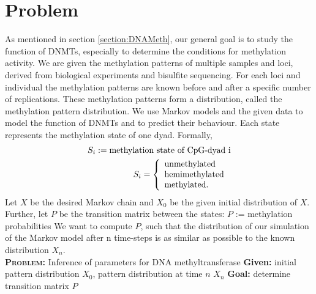 \section{Problem} 
\label{section:Problem}
As mentioned in section \ref{section:DNAMeth}, our general goal is to study the function of \acp{DNMT}, especially to determine the conditions for methylation activity. We are given the methylation patterns of multiple samples and loci, derived from biological experiments and bisulfite sequencing. For each loci and individual the methylation patterns are known before and after a specific number of replications. These methylation patterns form a distribution, called the methylation pattern distribution. We use Markov models and the given data to model the function of \acp{DNMT} and to predict their behaviour. Each state represents the methylation state of one dyad. Formally,
\begin{align}
S_i := \text{methylation state of CpG-dyad i}\\
S_i = \left\{
\begin{array}{l}
\text{unmethylated} \\
\text{hemimethylated} \\
\text{methylated.}
\end{array}
\right.\newline
\end{align}
Let $X$ be the desired Markov chain and $X_0$ be the given initial distribution of $X$. Further, let $P$ be the transition matrix between the states:\newline
$P$ := methylation probabilities\newline
We want to compute $P$, such that the distribution of our simulation of the Markov model after n time-steps is as similar as possible to the known distribution $X_n$.\\

\textbf{\textsc{Problem:}} Inference of parameters for DNA methyltransferase\newline
\textbf{Given:} initial pattern distribution $X_0$, pattern distribution at time $n$ $X_n$\newline
\textbf{Goal:} determine transition matrix $P$\\

